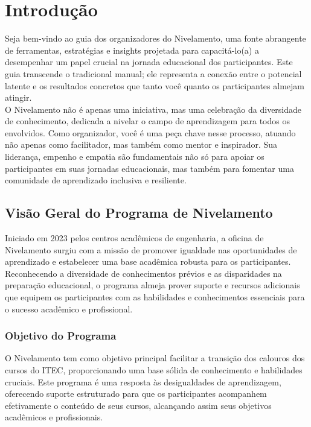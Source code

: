 \section{Introdução}

Seja bem-vindo ao guia dos organizadores do Nivelamento, uma fonte abrangente de ferramentas, estratégias e insights projetada para capacitá-lo(a) a desempenhar um papel crucial na jornada educacional dos participantes. Este guia transcende o tradicional manual; ele representa a conexão entre o potencial latente e os resultados concretos que tanto você quanto os participantes almejam atingir.\\

O Nivelamento não é apenas uma iniciativa, mas uma celebração da diversidade de conhecimento, dedicada a nivelar o campo de aprendizagem para todos os envolvidos. Como organizador, você é uma peça chave nesse processo, atuando não apenas como facilitador, mas também como mentor e inspirador. Sua liderança, empenho e empatia são fundamentais não só para apoiar os participantes em suas jornadas educacionais, mas também para fomentar uma comunidade de aprendizado inclusiva e resiliente.

\subsection{Visão Geral do Programa de Nivelamento}

Iniciado em 2023 pelos centros acadêmicos de engenharia, a oficina de Nivelamento surgiu com a missão de promover igualdade nas oportunidades de aprendizado e estabelecer uma base acadêmica robusta para os participantes. Reconhecendo a diversidade de conhecimentos prévios e as disparidades na preparação educacional, o programa almeja prover suporte e recursos adicionais que equipem os participantes com as habilidades e conhecimentos essenciais para o sucesso acadêmico e profissional.

\subsubsection{Objetivo do Programa}

O Nivelamento tem como objetivo principal facilitar a transição dos calouros dos cursos do ITEC, proporcionando uma base sólida de conhecimento e habilidades cruciais. Este programa é uma resposta às desigualdades de aprendizagem, oferecendo suporte estruturado para que os participantes acompanhem efetivamente o conteúdo de seus cursos, alcançando assim seus objetivos acadêmicos e profissionais.

